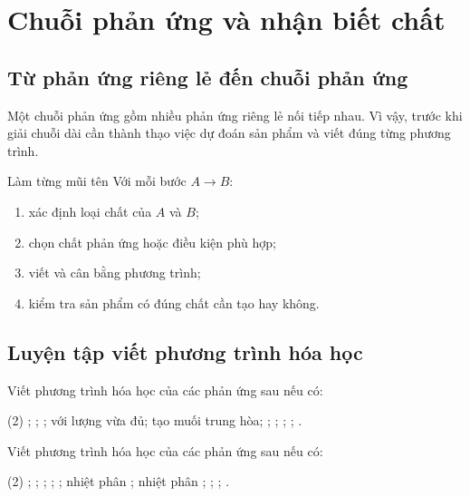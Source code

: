\section{Chuỗi phản ứng và nhận biết chất}

\subsection{Từ phản ứng riêng lẻ đến chuỗi phản ứng}

Một chuỗi phản ứng gồm nhiều phản ứng riêng lẻ nối tiếp nhau. Vì vậy, trước khi giải chuỗi dài cần thành thạo việc dự đoán sản phẩm và viết đúng từng phương trình.

\begin{ghinho}{Làm từng mũi tên}
Với mỗi bước $A\to B$:
\begin{enumerate}
\item xác định loại chất của $A$ và $B$;
\item chọn chất phản ứng hoặc điều kiện phù hợp;
\item viết và cân bằng phương trình;
\item kiểm tra sản phẩm có đúng chất cần tạo hay không.
\end{enumerate}
\end{ghinho}

\subsection{Luyện tập viết phương trình hóa học}

\begin{tuluyen}
Viết phương trình hóa học của các phản ứng sau nếu có:
\begin{tasks}(2)
	\task {};
	\task {};
	\task {};
	\task {} với lượng  vừa đủ;
	\task {} tạo muối trung hòa;
	\task {};
	\task {};
	\task {};
	\task {};
	\task {}.
\end{tasks}
\end{tuluyen}

\begin{tuluyen}
Viết phương trình hóa học của các phản ứng sau nếu có:
\begin{tasks}(2)
	\task {};
	\task {};
	\task {};
	\task {};
	\task {};
	\task nhiệt phân ;
	\task nhiệt phân ;
	\task {};
	\task {};
	\task {}.
\end{tasks}
\end{tuluyen}

